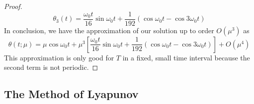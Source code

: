 \documentclass[../psets.tex]{subfiles}
\begin{document}
\begin{enumerate}
\begin{proof}
\begin{equation*}
            \theta_3(t) = \frac{\omega_0t}{16}\sin\omega_0t+\frac{1}{192}(\cos\omega_0t-\cos 3\omega_0t)
        \end{equation*}
        In conclusion, we have the approximation of our solution up to order $O(\mu^3)$ as
        \begin{equation*}
            \theta(t;\mu) = \mu\cos\omega_0t+\mu^3\left[ \frac{\omega_0t}{16}\sin\omega_0t+\frac{1}{192}(\cos\omega_0t-\cos 3\omega_0t) \right]+O(\mu^4)
        \end{equation*}
        This approximation is only good for $T$ in a fixed, small time interval because the second term is not periodic.
    \end{proof}
\end{enumerate}


\subsection*{The Method of Lyapunov}
\end{document}
